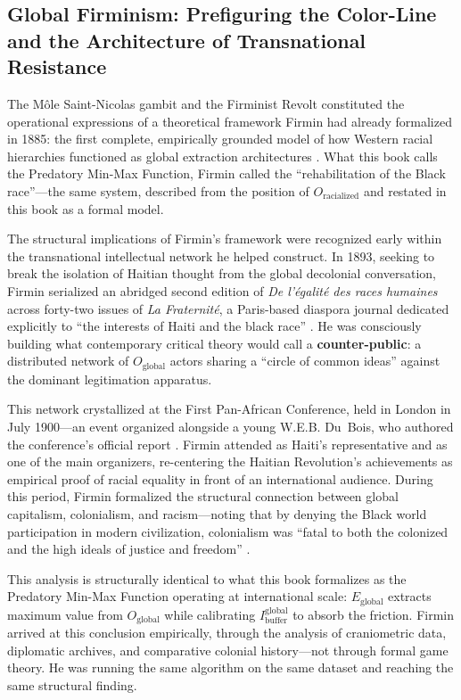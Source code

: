 \subsection{Global Firminism: Prefiguring the Color-Line and the Architecture of Transnational Resistance}

The M\^{o}le Saint-Nicolas gambit and the Firminist Revolt constituted the operational expressions of a theoretical framework Firmin had already formalized in 1885: the first complete, empirically grounded model of how Western racial hierarchies functioned as global extraction architectures \cite{firmin_legacy, manigat}. What this book calls the Predatory Min-Max Function, Firmin called the ``rehabilitation of the Black race''---the same system, described from the position of $O_{\text{racialized}}$ and restated in this book as a formal model.

The structural implications of Firmin's framework were recognized early within the transnational intellectual network he helped construct. In 1893, seeking to break the isolation of Haitian thought from the global decolonial conversation, Firmin serialized an abridged second edition of \textit{De l'égalité des races humaines} across forty-two issues of \textit{La Fraternité}, a Paris-based diaspora journal dedicated explicitly to ``the interests of Haiti and the black race'' \cite{firmin_legacy}. He was consciously building what contemporary critical theory would call a \textbf{counter-public}: a distributed network of $O_{\text{global}}$ actors sharing a ``circle of common ideas'' against the dominant legitimation apparatus.

This network crystallized at the First Pan-African Conference, held in London in July 1900---an event organized alongside a young W.E.B. Du~Bois, who authored the conference's official report \cite{firmin_legacy}. Firmin attended as Haiti's representative and as one of the main organizers, re-centering the Haitian Revolution's achievements as empirical proof of racial equality in front of an international audience. During this period, Firmin formalized the structural connection between global capitalism, colonialism, and racism---noting that by denying the Black world participation in modern civilization, colonialism was ``fatal to both the colonized and the high ideals of justice and freedom'' \cite{firmin_legacy}.

This analysis is structurally identical to what this book formalizes as the Predatory Min-Max Function operating at international scale: $E_{\text{global}}$ extracts maximum value from $O_{\text{global}}$ while calibrating $I_{\text{buffer}}^{\text{global}}$ to absorb the friction. Firmin arrived at this conclusion empirically, through the analysis of craniometric data, diplomatic archives, and comparative colonial history---not through formal game theory. He was running the same algorithm on the same dataset and reaching the same structural finding.


